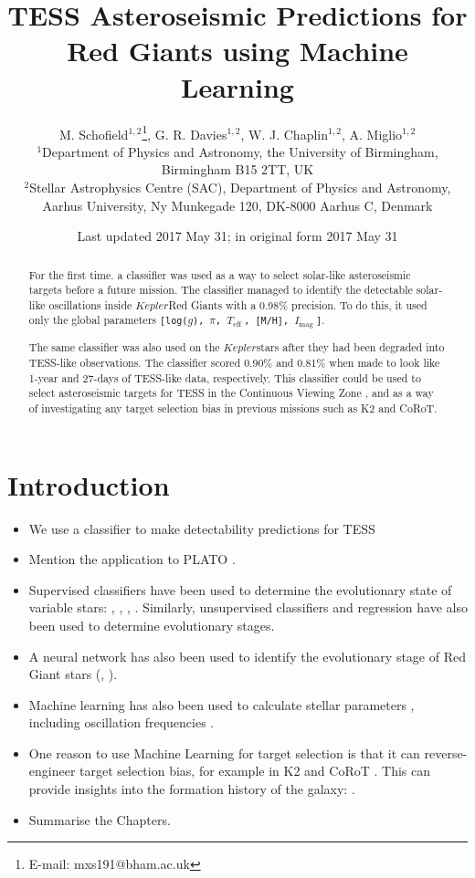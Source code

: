 \documentclass[a4paper,fleqn,usenatbib,useAMS]{mnras}
\title[Asteroseismology with Machine Learning]{TESS Asteroseismic Predictions for Red Giants using Machine Learning}
\author[M. Schofield et al.]{M. Schofield$^{1, 2}$\thanks{E-mail: mxs191@bham.ac.uk}, G. R. Davies$^{1, 2}$, W. J. Chaplin$^{1, 2}$, A. Miglio$^{1, 2}$
\\
$^{1}$Department of Physics and Astronomy, the University of Birmingham, Birmingham B15 2TT, UK \\
$^{2}$Stellar Astrophysics Centre (SAC), Department of Physics and Astronomy, Aarhus University, Ny Munkegade 120, DK-8000 Aarhus C, Denmark}
\date{Last updated 2017 May 31; in original form 2017 May 31}
\newcommand{\teff}{\ensuremath{T_{\textrm{eff}}\:}}
\newcommand{\kep}{\ensuremath{Kepler}\:}
\newcommand{\imag}{\ensuremath{I_{\textrm{mag}}\:}}
\begin{document}
\label{firstpage}
\pagerange{\pageref{firstpage}--\pageref{lastpage}}
\maketitle

\begin{abstract}
For the first time. a classifier was used as a way to select solar-like asteroseismic targets before a future mission. The classifier managed to identify the detectable solar-like oscillations inside \kep Red Giants with a 0.98\% precision. To do this, it used only the global parameters \texttt{[log($g$), $\pi$, \teff, [M/H], \imag]}.

The same classifier was also used on the \kep stars after they had been degraded into TESS-like observations. The classifier scored 0.90\% and 0.81\% when made to look like 1-year and 27-days of TESS-like data, respectively. This classifier could be used to select asteroseismic targets for TESS in the Continuous Viewing Zone \citep{ricker_transiting_2014}, and as a way of investigating any target selection bias in previous missions such as K2 and CoRoT.
\end{abstract}



\section{Introduction}

\begin{itemize}
\item We use a classifier to make detectability predictions for TESS \citep{ricker_transiting_2014}
\item Mention the application to PLATO \citep{rauer_plato_2014}.
\item Supervised classifiers have been used to determine the evolutionary state of variable stars: \citet{debosscher_automated_2007}, \citet{sarro_automated_2009}, \citet{nun_supervised_2014}, \citet{elorrieta_machine_2016}. Similarly, unsupervised classifiers \citep{valenzuela_unsupervised_2018} and regression \citep{ness_cannon_2015} have also been used to determine evolutionary stages.
\item A neural network has also been used to identify the evolutionary stage of Red Giant stars (\citet{hon_deep_2017}, \citet{hon_deep_2018}).
\item Machine learning has also been used to calculate stellar parameters \citep{bellinger_fundamental_2016}, including oscillation frequencies \citep{davies_oscillation_2016}.
\item One reason to use Machine Learning for target selection is that it can reverse-engineer target selection bias, for example in K2 \citep{lund_K2P2_2015} and CoRoT \citep{baglin_corot:_2006}. This can provide insights into the formation history of the galaxy: \citet{thomas_galactic_2017}.
\item Summarise the Chapters.
\end{itemize}
\end{document}
